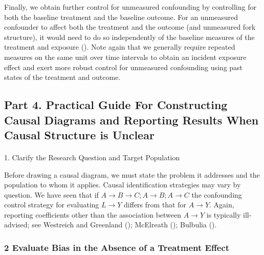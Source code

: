 \documentclass[
  singlecolumn]{article}
\makeatletter
\let\oldparagraph\paragraph
\renewcommand{\paragraph}{
    \@ifstar
      \xxxParagraphStar
      \xxxParagraphNoStar
  }
\newcommand{\xxxParagraphStar}[1]{\oldparagraph*{#1}\mbox{}}
\newcommand{\xxxParagraphNoStar}[1]{\oldparagraph{#1}\mbox{}}
\makeatother
\begin{document}
Finally, we obtain further control for unmeasured confounding by
controlling for both the baseline treatment and the baseline outcome.
For an unmeasured confounder to affect both the treatment and the
outcome (and unmeasured fork structure), it would need to do so
independently of the baseline measures of the treatment and exposure
(). Note
again that we generally require repeated measures on the same unit over
time intervals to obtain an incident exposure effect and exert more
robust control for unmeasured confounding using past states of the
treatment and outcome.

\subsection{Part 4. Practical Guide For Constructing Causal Diagrams and
Reporting Results When Causal Structure is Unclear}\label{section-part4}

\paragraph{1. Clarify the Research Question and Target
Population}\label{clarify-the-research-question-and-target-population}

Before drawing a causal diagram, we must state the problem it addresses
and the population to whom it applies. Causal identification strategies
may vary by question. We have seen that if
\(A\to B\to C; A\to B; A\to C\) the confounding control strategy for
evaluating \(L \to Y\) differs from that for \(A \to Y\). Again,
reporting coefficients other than the association between \(A \to Y\) is
typically ill-advised; see Westreich and Greenland
(); McElreath
(); Bulbulia
().

\subsubsection{2 Evaluate Bias in the Absence of a Treatment
Effect}\label{evaluate-bias-in-the-absence-of-a-treatment-effect}
\end{document}
